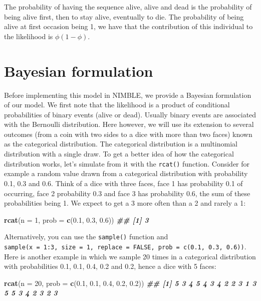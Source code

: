 \documentclass[
  12pt,
]{krantz}
\newenvironment{Shaded}{\begin{snugshade}}{\end{snugshade}}
\newcommand{\AttributeTok}[1]{\textcolor[rgb]{0.13,0.29,0.53}{#1}}
\newcommand{\DecValTok}[1]{\textcolor[rgb]{0.00,0.00,0.81}{#1}}
\newcommand{\DocumentationTok}[1]{\textcolor[rgb]{0.56,0.35,0.01}{\textbf{\textit{#1}}}}
\newcommand{\FloatTok}[1]{\textcolor[rgb]{0.00,0.00,0.81}{#1}}
\newcommand{\FunctionTok}[1]{\textcolor[rgb]{0.13,0.29,0.53}{\textbf{#1}}}
\newcommand{\NormalTok}[1]{#1}
\begin{document}
The probability of having the sequence alive, alive and dead is the probability of being alive first, then to stay alive, eventually to die. The probability of being alive at first occasion being 1, we have that the contribution of this individual to the likelihood is \(\phi (1 - \phi)\).

\section{Bayesian formulation}\label{bayesian-formulation}

Before implementing this model in NIMBLE, we provide a Bayesian formulation of our model. We first note that the likelihood is a product of conditional probabilities of binary events (alive or dead). Usually binary events are associated with the Bernoulli distribution. Here however, we will use its extension to several outcomes (from a coin with two sides to a dice with more than two faces) known as the categorical distribution. The categorical distribution is a multinomial distribution with a single draw. To get a better idea of how the categorical distribution works, let's simulate from it with the \texttt{rcat()} function. Consider for example a random value drawn from a categorical distribution with probability 0.1, 0.3 and 0.6. Think of a dice with three faces, face 1 has probability 0.1 of occurring, face 2 probability 0.3 and face 3 has probability 0.6, the sum of these probabilities being 1. We expect to get a 3 more often than a 2 and rarely a 1:

\begin{Shaded}
\begin{Highlighting}[]
\FunctionTok{rcat}\NormalTok{(}\AttributeTok{n =} \DecValTok{1}\NormalTok{, }\AttributeTok{prob =} \FunctionTok{c}\NormalTok{(}\FloatTok{0.1}\NormalTok{, }\FloatTok{0.3}\NormalTok{, }\FloatTok{0.6}\NormalTok{))}
\DocumentationTok{\#\# [1] 3}
\end{Highlighting}
\end{Shaded}

Alternatively, you can use the \texttt{sample()} function and \texttt{sample(x\ =\ 1:3,\ size\ =\ 1,\ replace\ =\ FALSE,\ prob\ =\ c(0.1,\ 0.3,\ 0.6))}. Here is another example in which we sample 20 times in a categorical distribution with probabilities 0.1, 0.1, 0.4, 0.2 and 0.2, hence a dice with 5 faces:

\begin{Shaded}
\begin{Highlighting}[]
\FunctionTok{rcat}\NormalTok{(}\AttributeTok{n =} \DecValTok{20}\NormalTok{, }\AttributeTok{prob =} \FunctionTok{c}\NormalTok{(}\FloatTok{0.1}\NormalTok{, }\FloatTok{0.1}\NormalTok{, }\FloatTok{0.4}\NormalTok{, }\FloatTok{0.2}\NormalTok{, }\FloatTok{0.2}\NormalTok{))}
\DocumentationTok{\#\#  [1] 5 3 4 5 4 3 4 2 2 3 1 3 5 5 3 4 2 3 2 3}
\end{Highlighting}
\end{Shaded}
\end{document}
